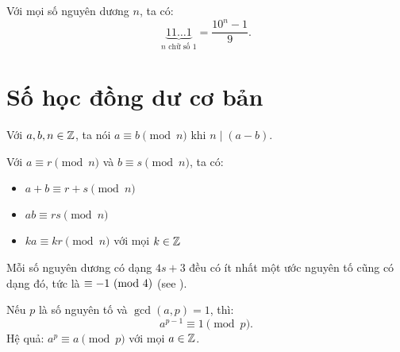 \documentclass[../imo-training-open-book.tex]{subfiles}
\begin{document}
\begin{lemma}
    \label{lemma:repunit-form}
    Với mọi số nguyên dương \(n\), ta có:
    \[
        \underbrace{11\dots1}_{n\text{ chữ số }1} = \frac{10^n - 1}{9}.
    \]
\end{lemma}

\newpage

\section{Số học đồng dư cơ bản}

\begin{definition}
    \label{definition:modular-congruence}
    Với \( a, b, n \in \mathbb Z \), ta nói \( a \equiv b \pmod{n} \) khi \( n \mid (a - b) \).
\end{definition}

\vspace{1em}

\begin{theorem}
    \label{theorem:modular-properties}
    Với \( a \equiv r \pmod{n} \) và \( b \equiv s \pmod{n} \), ta có:
    \begin{itemize}[topsep=0pt, itemsep=0pt]
        \item \( a + b \equiv r + s \pmod{n} \)
        \item \( ab \equiv rs \pmod{n} \)
        \item \( ka \equiv kr \pmod{n} \) với mọi \( k \in \mathbb Z \)
    \end{itemize}
\end{theorem}

\vspace{1em}

\begin{theorem}
    \label{theorem:prime-divisor-4k3}
    Mỗi số nguyên dương có dạng \(4s + 3\) đều có ít nhất một ước nguyên tố cũng có dạng đó, tức là \(\equiv -1 \ (\mathrm{mod}\ 4)\)
    (see ).
\end{theorem}

\vspace{1em}

\begin{theorem}
    \label{theorem:fermat-little}
    Nếu \( p \) là số nguyên tố và \( \gcd(a, p) = 1 \), thì:
    \[
        a^{p-1} \equiv 1 \pmod{p}.
    \]
    Hệ quả: \( a^p \equiv a \pmod{p} \) với mọi \( a \in \mathbb Z \).
\end{theorem}
\end{document}
